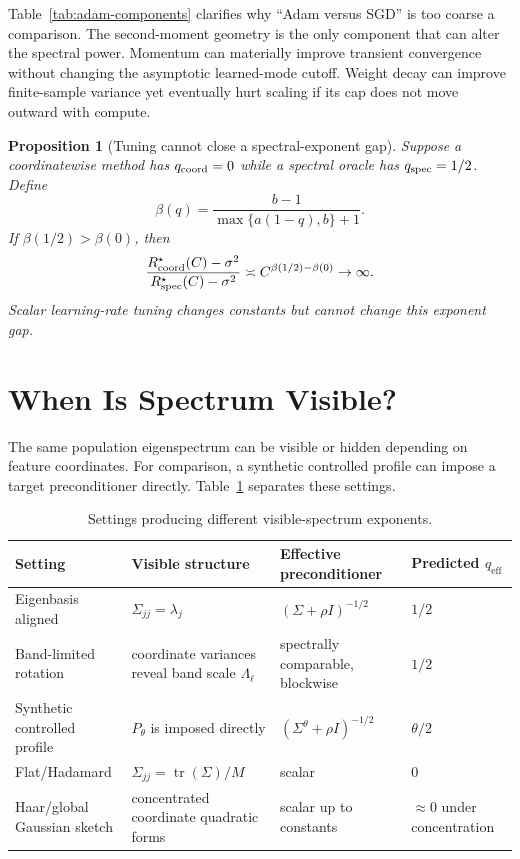 \documentclass[letterpaper]{article} %
\newtheorem{proposition}{Proposition}
\newcommand{\tr}{\operatorname{tr}}
\newcommand{\qeff}{q_{\mathrm{eff}}}
\begin{document}
Table~\ref{tab:adam-components} clarifies why ``Adam versus SGD'' is too coarse a comparison.  The second-moment geometry is the only component that can alter the spectral power.  Momentum can materially improve transient convergence without changing the asymptotic learned-mode cutoff.  Weight decay can improve finite-sample variance yet eventually hurt scaling if its cap does not move outward with compute.

\begin{proposition}[Tuning cannot close a spectral-exponent gap]
\label{prop:oracle-separation}
Suppose a coordinatewise method has $q_{\rm coord}=0$ while a spectral oracle has $q_{\rm spec}=1/2$.  Define
\[
 \beta(q)=\frac{b-1}{\max\{a(1-q),b\}+1}.
\]
If $\beta(1/2)>\beta(0)$, then
\[
 \frac{R^\star_{\rm coord}(C)-\sigma^2}
 {R^\star_{\rm spec}(C)-\sigma^2}
 \asymp C^{\beta(1/2)-\beta(0)}\to\infty.
\]
Scalar learning-rate tuning changes constants but cannot change this exponent gap.
\end{proposition}

\section{When Is Spectrum Visible?}
\label{sec:visibility-cases}

The same population eigenspectrum can be visible or hidden depending on feature coordinates.  For comparison, a synthetic controlled profile can impose a target preconditioner directly.  Table~\ref{tab:visibility-cases} separates these settings.

\begin{table}[t]
\centering
\small
\caption{Settings producing different visible-spectrum exponents.}
\label{tab:visibility-cases}
\begin{tabular}{@{}p{}p{}p{}p{}@{}}
\toprule
Setting & Visible structure & Effective preconditioner &
\shortstack{Predicted\\$\qeff$}\\
\midrule
Eigenbasis aligned & $\Sigma_{jj}=\lambda_j$ &
$(\Sigma+\rho I)^{-1/2}$ & $1/2$\\
Band-limited rotation & coordinate variances reveal band scale $\Lambda_\ell$ &
spectrally comparable, blockwise & $1/2$\\
\shortstack[l]{Synthetic controlled\\profile} & $P_\theta$ is imposed directly &
$(\Sigma^\theta+\rho I)^{-1/2}$ & $\theta/2$\\
Flat/Hadamard & $\Sigma_{jj}=\tr(\Sigma)/M$ &
scalar & $0$\\
\shortstack[l]{Haar/global\\Gaussian sketch} &
concentrated coordinate quadratic forms &
scalar up to constants & \shortstack[l]{$\approx0$ under\\concentration}\\
\bottomrule
\end{tabular}
\end{table}
\end{document}
